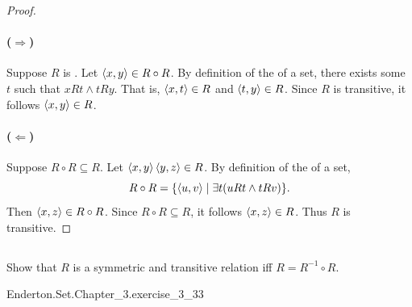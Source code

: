 \documentclass{report}
\begin{document}
  \begin{proof}

    \paragraph{($\Rightarrow$)}%

      Suppose $R$ is .
      Let $\left< x, y \right> \in R \circ R$.
      By definition of the  of a set,
        there exists some $t$ such that $xRt \land tRy$.
      That is, $\left< x, t \right> \in R$ and $\left< t, y \right> \in R$.
      Since $R$ is transitive, it follows $\left< x, y \right> \in R$.

    \paragraph{($\Leftarrow$)}%

      Suppose $R \circ R \subseteq R$.
      Let $\left< x, y \right> \left< y, z \right> \in R$.
      By definition of the  of a set,
        $$R \circ R = \{\left< u, v \right> \mid \exists t(uRt \land tRv)\}.$$
      Then $\left< x, z \right> \in R \circ R$.
      Since $R \circ R \subseteq R$, it follows $\left< x, z \right> \in R$.
      Thus $R$ is transitive.

  \end{proof}

\subsection{}%

  Show that $R$ is a symmetric and transitive relation iff $R = R^{-1} \circ R$.

    {Enderton.Set.Chapter\_3.exercise\_3\_33}
\end{document}
